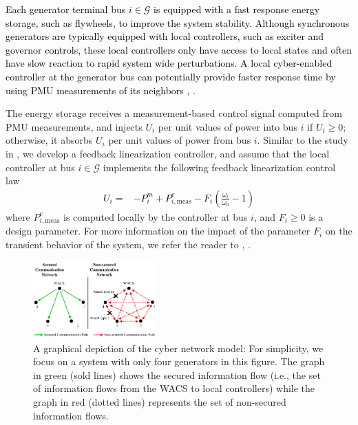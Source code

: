 \textcolor{black}{Each generator terminal bus $i\in\mathcal{G}$ is equipped with a fast response energy storage, such as flywheels, to improve the system stability. Although synchronous generators are typically equipped with local controllers, such as exciter and governor controls, these local controllers only have access to local states and often have slow reaction to rapid system wide perturbations. A local cyber-enabled controller at the generator bus can potentially provide faster response time by using PMU
measurements of its neighbors \cite{facts_storage2}, \cite{facts_storage21}.}

The energy storage receives a measurement-based control signal computed from PMU measurements, and injects $U_i$ per unit values of power into bus $i$ if $U_i\ge0$; otherwise, it absorbs $U_i$ per unit values of power from bus $i$. Similar to the study in \cite{facts_storage2}, we develop a feedback linearization controller, and assume that the local controller at bus $i\in\mathcal{G}$ implements the following feedback linearization control law
\textcolor{black}{\begin{align}\label{Eq:Ui}
U_i = & - P^m_{i} + P_{i,\text{meas}}^e - F_i \left(\frac{\omega_i}{\omega_0} - 1 \right)
\end{align}}
where $P_{i,\text{meas}}^e$ is computed locally by the controller at bus $i$, and $F_i \geq 0$ is a design parameter. For more information on the impact of the parameter $F_i$ on the transient behavior of the system, we refer the reader to \cite{facts_storage2}, \cite{facts_storage21}.


\begin{figure}
\includegraphics[width=0.42\textwidth]{chapters/se_nonlinear/figures/Comm_Net} \caption{A graphical depiction of the cyber network model: For simplicity, we focus on a system with only four generators in this figure. The graph in green (sold lines) shows the secured information flow (i.e., the set of information flows from the WACS to local controllers) while the graph in red (dotted lines) represents the set of non-secured information flows.}
\label{wacs}
\end{figure}

